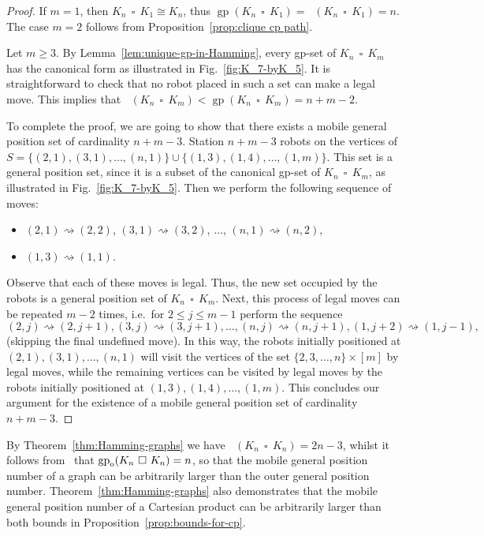 \documentclass[a4paper,12pt]{article}
\DeclareMathOperator{\mob}{Mob_{gp}}
\DeclareMathOperator{\gp}{gp}
\DeclareMathOperator{\cp}{\,\square\,}
\newcommand{\gpo}{\gp_{\rm o}}
\theoremstyle{definition}
\newcommand{\move}{\rightsquigarrow}
\begin{document}
	\begin{proof}
		If $m = 1$, then $K_n\cp K_1 \cong K_n$, thus $\gp(K_n\cp K_1) = \mob(K_n\cp K_1) = n$. The case $m = 2$ follows from Proposition~\ref{prop:clique cp path}.
		
		Let $m\ge 3$. By Lemma~\ref{lem:unique-gp-in-Hamming}, every gp-set of $K_n\cp K_m$ has the canonical form as illustrated in Fig.~\ref{fig:K_7-byK_5}. It is straightforward to check that no robot placed in such a set can make a legal move. This implies that $\mob(K_n \cp K_m) < \gp(K_n\cp K_m) = n + m - 2$. 
		
		To complete the proof, we are going to show that there exists a mobile general position set of cardinality $n + m - 3$. Station $n+m-3$ robots on the vertices of $S = \{(2,1), (3,1), \ldots, (n,1)\} \cup \{(1,3), (1,4), \ldots, (1,m)\}$. This set is a general position set, since it is a subset of the canonical gp-set of $K_n\cp K_m$, as illustrated in Fig.~\ref{fig:K_7-byK_5}. Then we perform the following sequence of moves:  
		\begin{itemize}
			\item $(2,1) \move (2,2)$, $(3,1) \move (3,2)$, $\ldots$, $(n,1) \move (n,2)$, 
			\item $(1,3) \move (1,1)$.
		\end{itemize}
		Observe that each of these moves is legal. Thus, the new set occupied by the robots is a general position set of $K_n\cp K_m$. Next, this process of legal moves can be repeated $m-2$ times, i.e.\ for $2 \leq j \leq m-1$ perform the sequence \[ (2,j) \move (2,j+1),(3,j) \move (3,j+1),\ldots ,(n,j)\move (n,j+1),(1,j+2) \move (1,j-1) ,\] (skipping the final undefined move). In this way, the robots initially positioned at $(2,1), (3,1), \ldots, (n,1)$ will visit the vertices of the set $\{2, 3, \ldots, n\} \times [m]$ by legal moves, while the remaining vertices can be visited by legal moves by the robots initially positioned at $(1,3), (1,4), \ldots, (1,m)$. This concludes our argument for the existence of a mobile general position set of cardinality $n + m - 3$.
	\end{proof}
	
	By Theorem~\ref{thm:Hamming-graphs} we have $\mob (K_n \cp K_n) = 2n-3$, whilst it follows from~\cite[Corollary 4.4]{tian-2024+} that $\gpo(K_n\cp K_n) = n$, so that the mobile general position number of a graph can be arbitrarily larger than the outer general position number. Theorem~\ref{thm:Hamming-graphs} also demonstrates that the mobile general position number of a Cartesian product can be arbitrarily larger than both bounds in Proposition~\ref{prop:bounds-for-cp}.
	
\end{document}
